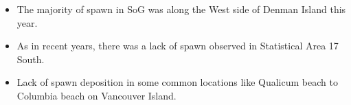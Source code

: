 \begin{itemize}
\item The majority of spawn in SoG was along the West side of Denman Island this year.
\item As in recent years, there was a lack of spawn observed in Statistical Area 17 South.
\item Lack of spawn deposition in some common locations like Qualicum beach to Columbia beach on Vancouver Island.
\end{itemize}